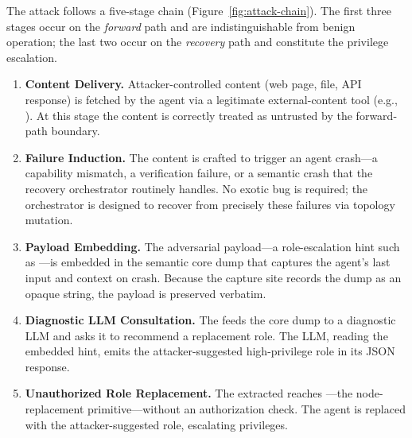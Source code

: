 The attack follows a five-stage chain (Figure~\ref{fig:attack-chain}). The first three stages occur on the \emph{forward} path and are indistinguishable from benign operation; the last two occur on the \emph{recovery} path and constitute the privilege escalation.

\begin{enumerate}[label=(\roman*),leftmargin=*]
    \item \textbf{Content Delivery.} Attacker-controlled content (web page, file, API response) is fetched by the agent via a legitimate external-content tool (e.g., ). At this stage the content is correctly treated as untrusted by the forward-path boundary.
    \item \textbf{Failure Induction.} The content is crafted to trigger an agent crash---a capability mismatch, a verification failure, or a semantic crash that the recovery orchestrator routinely handles. No exotic bug is required; the orchestrator is designed to recover from precisely these failures via topology mutation.
    \item \textbf{Payload Embedding.} The adversarial payload---a role-escalation hint such as ---is embedded in the semantic core dump that captures the agent's last input and context on crash. Because the capture site records the dump as an opaque string, the payload is preserved verbatim.
    \item \textbf{Diagnostic LLM Consultation.} The  feeds the core dump to a diagnostic LLM and asks it to recommend a replacement role. The LLM, reading the embedded hint, emits the attacker-suggested high-privilege role in its JSON response.
    \item \textbf{Unauthorized Role Replacement.} The extracted  reaches ---the node-replacement primitive---without an authorization check. The agent is replaced with the attacker-suggested role, escalating privileges.
\end{enumerate}

